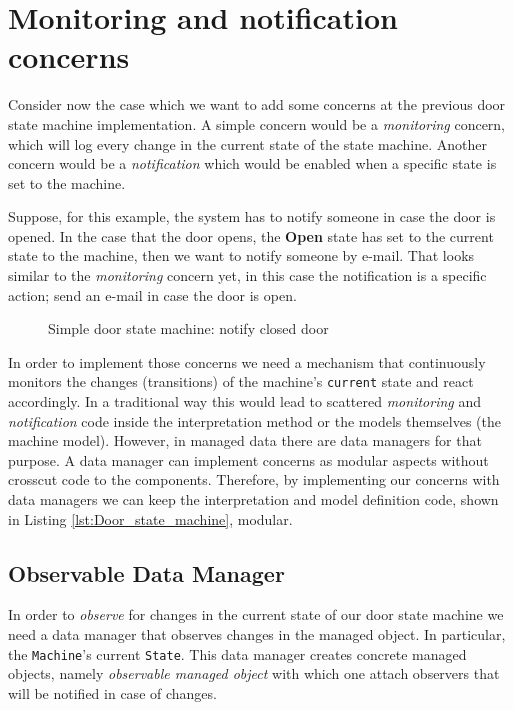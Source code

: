\section{Monitoring and notification concerns}
Consider now the case which we want to add some concerns at the previous door state machine implementation.
A simple concern would be a \textit{monitoring} concern, which will log every change in the current state of the state machine.
Another concern would be a \textit{notification} which would be enabled when a specific state is set to the machine.

Suppose, for this example, the system has to notify someone in case the door is opened.
In the case that the door opens, the \textbf{Open} state has set to the current state to the machine, then we want to notify someone by e-mail.
That looks similar to the \textit{monitoring} concern yet, in this case the notification is a specific action; send an e-mail in case the door is open.

\begin{figure}[H]
	\centering
  	\caption{Simple door state machine: notify closed door}
  	\label{fig:State_machine_danger}
\end{figure}

In order to implement those concerns we need a mechanism that continuously monitors the changes (transitions) of the machine's \texttt{current} state and react accordingly.
In a traditional way this would lead to scattered \textit{monitoring} and \textit{notification} code inside the interpretation method or the models themselves (the machine model).
However, in managed data there are data managers for that purpose.
A data manager can implement concerns as modular aspects without crosscut code to the components.
Therefore, by implementing our concerns with data managers we can keep the interpretation and model definition code, shown in Listing \ref{lst:Door_state_machine}, modular.

\subsection{Observable Data Manager}
In order to \textit{observe} for changes in the current state of our door state machine we need a data manager that observes changes in the managed object.
In particular, the \texttt{Machine}'s current \texttt{State}.
This data manager creates concrete managed objects, namely \textit{observable managed object} with which one attach observers that will be notified in case of changes.


